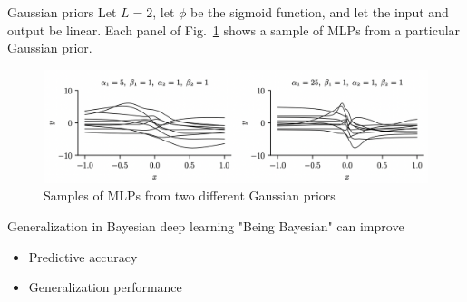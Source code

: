 \documentclass{beamer}
\begin{document}
\begin{frame}{Gaussian priors}
    Let $L = 2$, let $\phi$ be the sigmoid function, and let the input and output be linear. Each panel of Fig.~\ref{fig:mlp_priors} shows a sample of MLPs from a particular Gaussian prior.
    \begin{figure}
        \centering
        \includegraphics[width=\textwidth]{mlp_priors}
        \caption{Samples of MLPs from two different Gaussian priors}
        \label{fig:mlp_priors}
    \end{figure}
\end{frame}

\begin{frame}{Generalization in Bayesian deep learning}
    "Being Bayesian" can improve
    \begin{itemize}
        \item Predictive accuracy
        \item Generalization performance
    \end{itemize}
\end{frame}
\end{document}
